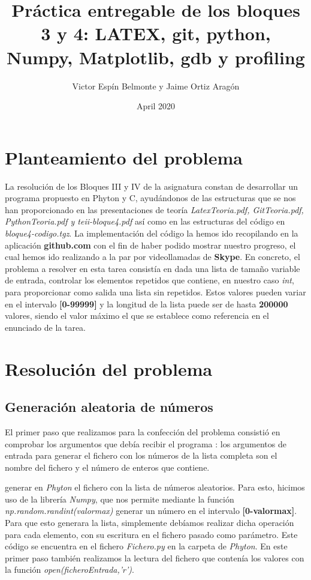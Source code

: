 \documentclass{article}
\title{Práctica entregable de los bloques 3 y 4: 
\newline LATEX, git, python, Numpy, Matplotlib, gdb y profiling}
\author{ Victor Espín Belmonte y Jaime Ortiz Aragón }
\date{April 2020}
\begin{document}
\maketitle

\section{Planteamiento del problema}
La resolución de los Bloques III y IV de la asignatura constan de desarrollar un programa propuesto en Phyton y C, ayudándonos de las estructuras que se nos han proporcionado en las presentaciones de teoría \textit{LatexTeoria.pdf, GitTeoria.pdf, PythonTeoria.pdf y teii-bloque4.pdf} así como en las estructuras del código en \textit{bloque4-codigo.tgz}. La implementación del código la hemos ido recopilando en la aplicación \textbf{github.com} con el fin de haber podido mostrar nuestro progreso, el cual hemos ido realizando a la par por videollamadas de \textbf{Skype}.
\newline\newline
En concreto, el problema a resolver en esta tarea consistía en dada una lista de tamaño variable de entrada, controlar los elementos repetidos que contiene, en nuestro caso \textit{int}, para proporcionar como salida una lista sin repetidos.
\newline
Estos valores pueden variar en el intervalo \textbf{[0-99999]} y la longitud de la lista puede ser de hasta \textbf{200000} valores, siendo el valor máximo el que se establece como referencia en el enunciado de la tarea.


\section{Resolución del problema}
\subsection{Generación aleatoria de números}
El primer paso que realizamos para la confección del problema consistió en comprobar los argumentos que debía recibir el programa : los argumentos de entrada para generar el fichero con los números de la lista completa son el nombre del fichero y el número de enteros que contiene.

generar en \textit{Phyton} el fichero con la lista de números aleatorios.
\newline
Para esto, hicimos uso de la librería \textit{Numpy}, que nos permite mediante la función \textit{np.random.randint(valormax)} generar un número en el intervalo \textbf{[0-valormax]}. Para que esto generara la lista, simplemente debíamos realizar dicha operación para cada elemento, con su escritura en el fichero pasado como parámetro.
\newline
Este código se encuentra en el fichero \textit{Fichero.py} en la carpeta de \textit{Phyton}.
\newline
En este primer paso también realizamos la lectura del fichero que contenía los valores con la función \textit{open(ficheroEntrada,'r')}.
\end{document}
